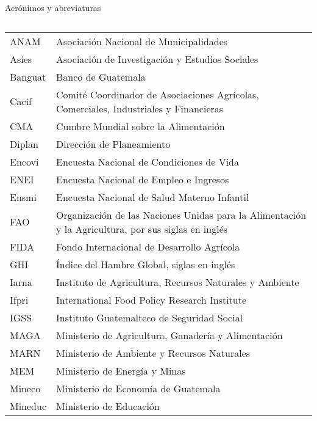 \newpage
	$\ $\\[-1cm]
 \textcolor{color2}{\Huge Acrónimos y abreviaturas}\\
	\normalsize	$\ $\\
\begin{center}\fontsize{3.8mm}{1.6em}\selectfont \setlength{\arrayrulewidth}{0.7pt}
	$\ $\\[-1.5cm]
	$\!$\begin{tabular}{p{4.3cm}l}	\hline
	ANAM	&	Asociación Nacional de Municipalidades	\\
\rowcolor{color1!5!white}	Asies	&	Asociación de Investigación y Estudios Sociales	\\
	Banguat	&	Banco de Guatemala	\\
\rowcolor{color1!5!white}	Cacif	&	Comité Coordinador de Asociaciones Agrícolas, Comerciales, Industriales y Financieras	\\
	CMA	&	Cumbre Mundial sobre la Alimentación	\\
\rowcolor{color1!5!white}	Diplan	&	Dirección de Planeamiento	\\
	Encovi	&	Encuesta Nacional de Condiciones de Vida	\\
\rowcolor{color1!5!white}	ENEI	&	Encuesta Nacional de Empleo e Ingresos	\\
	Ensmi	&	Encuesta Nacional de Salud Materno Infantil	\\
\rowcolor{color1!5!white}	FAO	&	Organización de las Naciones Unidas para la Alimentación y la Agricultura, por sus siglas en inglés	\\
	FIDA	&	Fondo Internacional de Desarrollo Agrícola	\\
\rowcolor{color1!5!white}	GHI	&	Índice del Hambre Global, siglas en inglés	\\
	Iarna	&	Instituto de Agricultura, Recursos Naturales y Ambiente	\\
\rowcolor{color1!5!white}	Ifpri	&	International Food Policy Research Institute	\\
	IGSS	&	Instituto Guatemalteco de Seguridad Social	\\
\rowcolor{color1!5!white}	MAGA	&	Ministerio de Agricultura, Ganadería y Alimentación	\\
	MARN	&	Ministerio de Ambiente y Recursos Naturales	\\
\rowcolor{color1!5!white}	MEM	&	Ministerio de Energía y Minas	\\
	Mineco	&	Ministerio de Economía de Guatemala	\\
\rowcolor{color1!5!white}	Mineduc	&	Ministerio de Educación	\\

\end{tabular}
\end{center}
